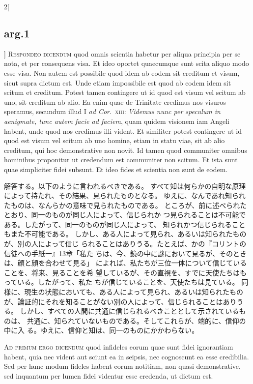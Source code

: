 \documentclass[paper=a4paper,fontsize=10pt,jafontsize=9pt,titlepage]{jlreq}
\begin{document}
\begin{paracol}{2}[\subsection{arg.1}]
{\scshape Respondeo dicendum} quod omnis scientia habetur per aliqua
principia per se nota, et per consequens visa. Et ideo oportet
quaecumque sunt scita aliquo modo esse visa. Non autem est possibile
quod idem ab eodem sit creditum et visum, sicut supra dictum est. Unde
etiam impossibile est quod ab eodem idem sit scitum et creditum. Potest
tamen contingere ut id quod est visum vel scitum ab uno, sit creditum ab
alio. Ea enim quae de Trinitate credimus nos visuros speramus, secundum
illud I {\itshape ad Cor}.~{\scshape xiii}: {\itshape Videmus nunc per
speculum in aenigmate, tunc autem facie ad faciem}, quam quidem visionem
iam Angeli habent, unde quod nos credimus illi vident. Et similiter
potest contingere ut id quod est visum vel scitum ab uno homine, etiam
in statu viae, sit ab alio creditum, qui hoc demonstrative non novit. Id
tamen quod communiter omnibus hominibus proponitur ut credendum est
communiter non scitum. Et ista sunt quae simpliciter fidei subsunt. Et
ideo fides et scientia non sunt de eodem.

\switchcolumn

解答する。以下のように言われるべきである。
すべて知は何らかの自明な原理によって持たれ、その結果、見られたものとなる。
ゆえに、なんであれ知られたものは、なんらかの意味で見られたものである。
 ところが、前に述べられたとおり、同一のものが同じ人によって、信じられか
 つ見られることは不可能である。したがって、同一のものが同じ人によって、
 知られかつ信じられることもまた不可能である。
しかし、ある人によって見られ、あるいは知られたものが、別の人によって信じ
 られることはありうる。たとえば、かの『コリントの信徒への手紙一』13章「私た
 ちは、今、鏡の中に謎において見るが、そのときは、顔と顔を合わせて見る」
 によれば、私たちが三位一体について信じていることを、将来、見ることを希
 望しているが、その直視を、すでに天使たちはもっている。したがって、私た
 ちが信じていることを、天使たちは見ている。
同様に、現生の状態においても、ある人によって見られ、あるいは知られたもの
が、論証的にそれを知ることがない別の人によって、信じられることはありうる。
しかし、すべての人間に共通に信じられるべきこととして示されているものは、
 共通に、知られていないものである。そしてこれらが、端的に、信仰の中に入
 る。ゆえに、信仰と知は、同一のものにかかわらない。

\switchcolumn*[\subsection{ad.1}]

{\scshape Ad primum ergo dicendum} quod infideles
eorum quae sunt fidei ignorantiam habent, quia nec vident aut sciunt ea
in seipsis, nec cognoscunt ea esse credibilia. Sed per hunc modum
fideles habent eorum notitiam, non quasi demonstrative, sed inquantum
per lumen fidei videntur esse credenda, ut dictum est.


\end{paracol}
\end{document}
